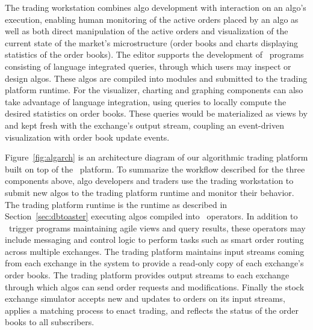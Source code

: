 
The trading workstation combines algo development with interaction on an algo's
execution, enabling human monitoring of the active orders placed by an algo as
well as both direct manipulation of the active orders and visualization of the
current state of the market's microstructure (order books and charts displaying
statistics of the order books). The editor supports the development of
\targetlang\ programs consisting of language integrated queries, through which
users may inspect or design algos. These algos are compiled into modules and
submitted to the trading platform runtime. For the visualizer, charting and
graphing components can also take advantage of language integration, using
queries to locally compute the desired statistics on order books. These queries
would be materialized as views by \compiler and kept fresh with the exchange's
output stream, coupling an event-driven visualization with order book update
events.


Figure~\ref{fig:algarch} is an architecture diagram of our algorithmic trading
platform built on top of the \compiler\ platform. To summarize the workflow
described for the three components above, algo developers and traders use the
trading workstation to submit new algos to the trading platform runtime and
monitor their behavior. The trading platform runtime is the \compiler runtime as
described in Section~\ref{sec:dbtoaster} executing algos compiled into
\targetlang\ operators. In addition to \compiler\ trigger programs maintaining
agile views and query results, these operators may include messaging and control
logic to perform tasks such as smart order routing across multiple exchanges.
The trading platform maintains input streams coming from each exchange in the
system to provide a read-only copy of each exchange's order books. The trading
platform provides output streams to each exchange through which algos can send
order requests and modifications. Finally the stock exchange simulator accepts
new and updates to orders on its input streams, applies a matching process to
enact trading, and reflects the status of the order books to all subscribers. 

